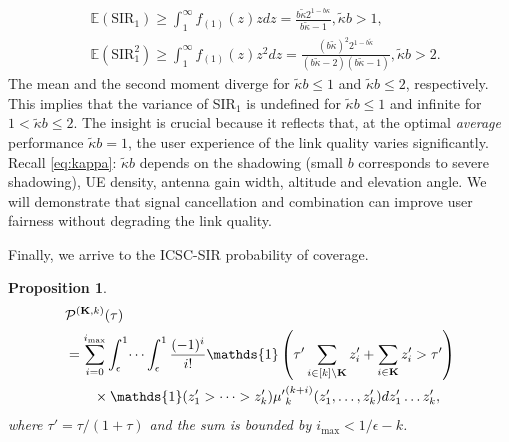\documentclass[conference]{IEEEtran}
\theoremstyle{definition}
\theoremstyle{plain}
\newtheorem{prop}[thm4]{Proposition}
\begin{document}
          \begin{align}
            &\mathbb{E}(\text{SIR}_1)  \geq\int_{1}^{\infty}f_{(1)}(z)zdz=\frac{b \tilde{\kappa}  2^{1-b \kappa }}{b \tilde{\kappa} -1}, \tilde{\kappa}b >1, \\
            &\mathbb{E}(\text{SIR}^2_1) \geq \int_{1}^{\infty}f_{(1)}(z)z^2dz = \frac{(b \tilde{\kappa}) ^2 2^{1-b \tilde{\kappa} }}{(b\tilde{\kappa} - 2)  (b\tilde{\kappa} - 1)},\tilde{\kappa}b >2.
          \end{align}
          The mean and the second moment diverge for $\tilde{\kappa}b\leq 1$ and $\tilde{\kappa}b\leq 2$, respectively. This implies that the variance of SIR$_1$ is undefined for $\tilde{\kappa}b \leq 1$ and infinite for $1 <\tilde{\kappa}b \leq 2$. The insight is crucial because it reflects that, at the optimal \textit{average} performance $\tilde{\kappa}b = 1$, the user experience of the link quality varies significantly. Recall \eqref{eq:kappa}: $\tilde{\kappa}b$ depends on the shadowing (small $b$ corresponds to severe shadowing), UE density, antenna gain width, altitude and elevation angle. We will demonstrate that signal cancellation and combination can improve user fairness without degrading the link quality.



          
          Finally, we arrive to the ICSC-SIR probability of coverage.
          \begin{prop}
            \begin{align}
              &\mathcal{P}^{(\mathbf{K},k)}(\tau) \nonumber\\
              &= \sum^{i_{\text{max}}}_{i=0} \int_{\epsilon}^1 \dots \int_{\epsilon}^1\frac{(-1)^i}{i!}\mathds{1}\left(\tau' \sum_{i \in [k] \setminus  \mathbf{K}}z'_i+ \sum_{i\in \mathbf{K}} z'_i>\tau' \right) \nonumber \\
              &\hspace{0.7cm}\times \mathds{1}(z'_1>\dots>z'_k){\mu'}_k^{(k+i)}(z'_1,\dots,z'_k) d z'_1 \dots z'_k,
            \end{align}
            where $\tau' = \tau/(1+\tau)$ and the sum is bounded by $i_{\text{max}}< 1/\epsilon-k$. 
          \end{prop}

          
          
          
        

          
          
          
\end{document}

